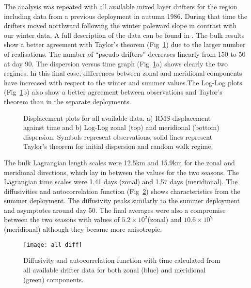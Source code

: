 The analysis was repeated with all available mixed layer drifters
for the region including data from a previous deployment in autumn
1986. During that time the drifters moved northward following the
winter poleward slope in contrast with our winter data. A full
description of the data can be found in \citet{Haynes91}. The bulk
results show a better agreement with Taylor's theorem
(Fig~\ref{fig:drf_allrms}) due to the larger number of
realisations. The number of ``pseudo drifters'' decreases linearly
from 150 to 50 at day 90. The dispersion versus time graph
(Fig~\ref{fig:drf_allrms}a) shows clearly the two regimes. In this
final case, differences between zonal and meridional components
have increased with respect to the winter and summer values.The
Log-Log plots (Fig~\ref{fig:drf_allrms}b) also show a better
agreement between observations and Taylor's theorem than in the
separate deployments.
\begin{figure}
\centering %
\caption{Displacement plots for all available data. a) RMS
displacement against time and b) Log-Log zonal (top) and
meridional (bottom) dispersion. Symbols represent observations,
solid lines represent Taylor's theorem for initial dispersion and
random walk regime.}
\label{fig:drf_allrms}%
\end{figure}

The bulk Lagrangian length scales were 12.5km and 15.9km for the
zonal and meridional directions, which lay in between the values
for the two seasons. The Lagrangian time scales were 1.41 days
(zonal) and 1.57 days (meridional). The diffusivities and
autocorrelation function (Fig~\ref{fig:drf_alldiff}) shows
characteristics from the summer deployment. The diffusivity peaks
similarly to the summer deployment and asymptotes around day 50.
The final averages were also a compromise between the two seasons
with values of $5.2\times10^2$\mix (zonal) and
$10.6\times10^2$\mix (meridional) although they became more
anisotropic.

\begin{figure}
\centering %
\texttt{[image: all\_diff]}
\caption{Diffusivity and autocorrelation function with time
calculated from all available drifter data for both zonal (blue)
and meridional (green) components.}
\label{fig:drf_alldiff}%
\end{figure}

